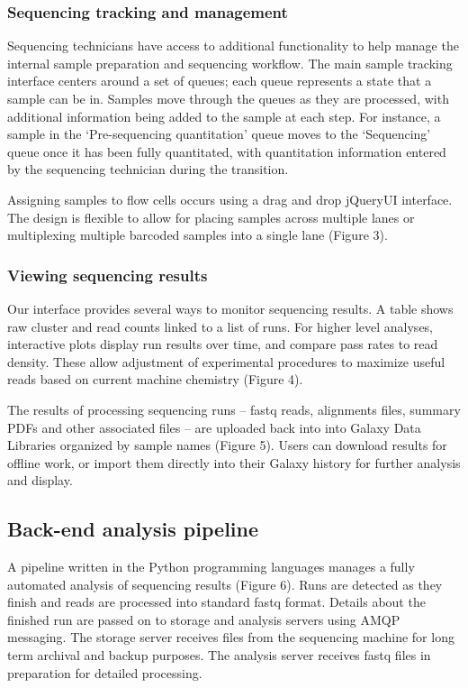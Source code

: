 \documentclass[10pt]{bmc_article}
\newenvironment{bmcformat}{\begin{raggedright}\baselineskip20pt\sloppy\setboolean{publ}{false}}{\end{raggedright}\baselineskip20pt\sloppy}
\begin{document}
\begin{bmcformat}
\subsubsection*{Sequencing tracking and management}

Sequencing technicians have access to additional
functionality to help manage the internal sample preparation and
sequencing workflow. The main sample tracking interface centers around
a set of queues; each queue represents a state that a sample can be
in. Samples move through the queues as they are processed, with
additional information being added to the sample at each step. For
instance, a sample in the ‘Pre-sequencing quantitation’ queue moves to
the ‘Sequencing’ queue once it has been fully quantitated, with
quantitation information entered by the sequencing technician during
the transition.

Assigning samples to flow cells occurs using a drag and drop jQueryUI
interface. The design is flexible to allow for placing samples across
multiple lanes or multiplexing multiple barcoded samples into a single
lane (Figure 3).

\subsubsection*{Viewing sequencing results}

Our interface provides several ways to monitor sequencing results.
A table shows raw cluster and read counts linked to a list of runs.
For higher level analyses, interactive plots display run results over
time, and compare pass rates to read density. These allow adjustment of
experimental procedures to maximize useful reads based on current
machine chemistry (Figure 4).

The results of processing sequencing runs -- fastq reads, alignments
files, summary PDFs and other associated files -- are uploaded back
into into Galaxy Data Libraries organized by sample names (Figure
5). Users can download results for offline work, or import them
directly into their Galaxy history for further analysis and display.

\subsection*{Back-end analysis pipeline}

A pipeline written in the Python programming languages manages a fully
automated analysis of sequencing results (Figure 6). Runs are detected
as they finish and reads are processed into standard fastq
format. Details about the finished run are passed on to storage and
analysis servers using AMQP messaging. The storage server receives
files from the sequencing machine for long term archival and backup
purposes. The analysis server receives fastq files in preparation for
detailed processing.


\end{bmcformat}
\end{document}
